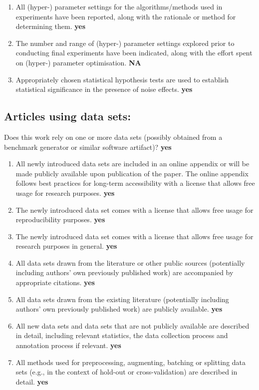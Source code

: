 \documentclass[manuscript, screen, review]{jair}
\begin{document}
\begin{enumerate}
    \textbf{yes}
    \item
    All (hyper-) parameter settings for
    the algorithms/methods used in experiments have been reported, along with the rationale or method for determining them.
    \textbf{yes}
    \item
    The number and range of (hyper-) parameter settings explored prior to conducting final experiments have been indicated, along with the effort spent on (hyper-) parameter optimisation.
    \textbf{NA}
    \item
    Appropriately chosen statistical hypothesis tests are used to establish statistical significance
    in the presence of noise effects.
    \textbf{yes}
\end{enumerate}

\subsection*{Articles using data sets:}
Does this work rely on one or more data sets (possibly obtained from a benchmark generator or similar software artifact)?
\textbf{yes}

\begin{enumerate}
    \item
    All newly introduced data sets
    are included in an online appendix
    or will be made publicly available upon publication of the paper.
    The online appendix follows best practices for long-term accessibility with a license
    that allows free usage for research purposes.
    \textbf{yes}
    \item The newly introduced data set comes with a license that
    allows free usage for reproducibility purposes.
    \textbf{yes}
    \item The newly introduced data set comes with a license that
    allows free usage for research purposes in general.
    \textbf{yes}
    \item All data sets drawn from the literature or other public sources (potentially including authors' own previously published work) are accompanied by appropriate citations.
    \textbf{yes}
    \item All data sets drawn from the existing literature (potentially including authors' own previously published work) are publicly available. \textbf{yes}
    \item All new data sets and data sets that are not publicly available are described in detail, including relevant statistics, the data collection process and annotation process if relevant.
    \textbf{yes}
    \item
    All methods used for preprocessing, augmenting, batching or splitting data sets (e.g., in the context of hold-out or cross-validation)
    are described in detail. \textbf{yes}
\end{enumerate}
\end{document}
